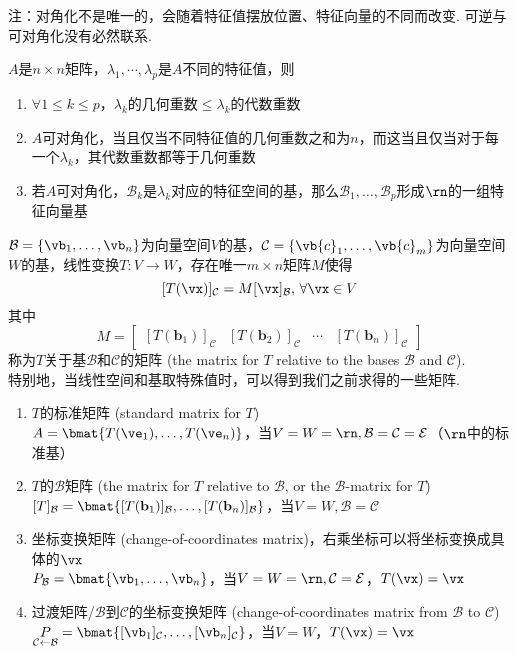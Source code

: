 注：对角化不是唯一的，会随着特征值摆放位置、特征向量的不同而改变. 可逆与可对角化没有必然联系.
\begin{theorem}
$A$是$n\times n$矩阵，$\lambda_1,\cdots,\lambda_p$是$A$不同的特征值，则
\begin{enumerate}
	\itemsep -3pt
	\item $\forall 1\leq k\leq p$，$\lambda_k$的几何重数$\leq\lambda_k$的代数重数
	\item $A$可对角化，当且仅当不同特征值的几何重数之和为$n$，而这当且仅当对于每一个$\lambda_k$，其代数重数都等于几何重数
	\item 若$A$可对角化，$\mathcal{B}_k$是$\lambda_k$对应的特征空间的基，那么$\mathcal{B}_1,\dots,\mathcal{B}_p$形成$\rn$的一组特征向量基
\end{enumerate}
\end{theorem}
\begin{theorem}[线性变换矩阵]
\label{linear_trans_tot}
$\mathcal{B}=\{\vb_1,\dots,\vb_n\}$为向量空间$V$的基，$\mathcal{C}=\{\vb{c}_1,\dots,\vb{c}_m\}$为向量空间$W$的基，线性变换$T:V\to W$，存在唯一$m\times n$矩阵$M$使得
\[[T(\vx)]_\mathcal{C}=M[\vx]_\mathcal{B},\,\forall\vx\in V\]
其中
\[M=\begin{bmatrix}[T(\mathbf{b}_1)]_\mathcal{C}&[T(\mathbf{b}_2)]_\mathcal{C}&\cdots&[T(\mathbf{b}_n)]_\mathcal{C}\end{bmatrix}\]
称为$T$关于基$\mathcal{B}$和$\mathcal{C}$的矩阵 (the matrix for $T$ relative to the bases $\mathcal{B}$ and $\mathcal{C}$).\\
特别地，当线性空间和基取特殊值时，可以得到我们之前求得的一些矩阵.
\begin{enumerate}
	\itemsep -1pt
	\item $T$的标准矩阵 (standard matrix for $T$)\\
	$A=\bmat{T(\ve_1),\ldots,T(\ve_n)}$，当$V=W=\rn,\mathcal{B}=\mathcal{C}=\mathcal{E}$（$\rn$中的标准基）
	\item $T$的$\mathcal{B}$矩阵 (the matrix for $T$ relative to $\mathcal{B}$, or the $\mathcal{B}$-matrix for $T$)\\
	$[T]_{\mathcal{B}}=\bmat{[T(\mathbf{b}_1)]_\mathcal{B},\ldots,[T(\mathbf{b}_n)]_\mathcal{B}}$，当$V=W,\mathcal{B}=\mathcal{C}$
	\item 坐标变换矩阵 (change-of-coordinates matrix)，右乘坐标可以将坐标变换成具体的$\vx$\\
	$P_\mathcal{B}=\bmat{\vb_1,\ldots,\vb_n}$，当$V=W=\rn,\mathcal{C}=\mathcal{E}$，$T(\vx)=\vx$
	\item 过渡矩阵/$\mathcal{B}$到$\mathcal{C}$的坐标变换矩阵 (change-of-coordinates matrix from $\mathcal{B}$ to $\mathcal{C}$)\\
	$\underset{\mathcal{C}\gets \mathcal{B}}{P}=\bmat{[\vb_1]_{\mathcal{C}},\ldots,[\vb_n]_{\mathcal{C}}}$，当$V=W$，$T(\vx)=\vx$
\end{enumerate}
\end{theorem}
